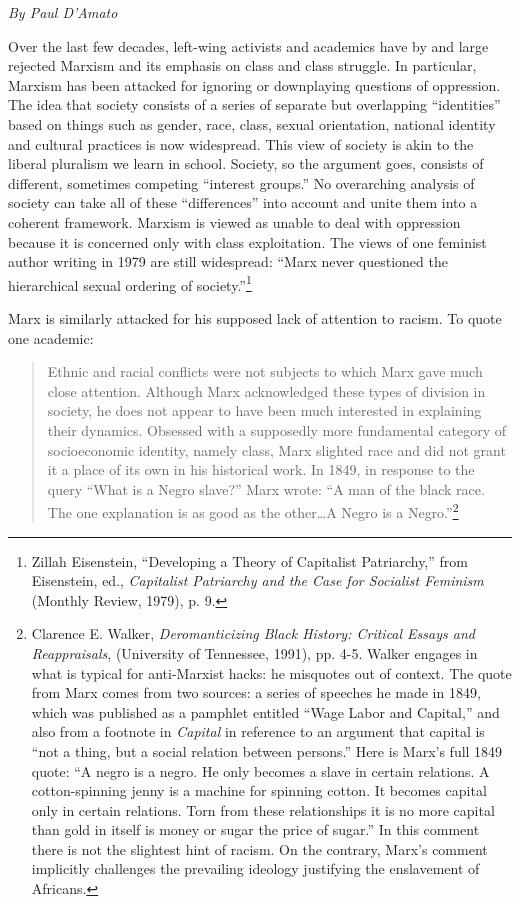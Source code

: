 \emph{By Paul D'Amato}

Over the last few decades, left-wing activists and academics have by and large rejected Marxism and its emphasis on class and class struggle. In particular, Marxism has been attacked for ignoring or downplaying questions of oppression. The idea that society consists of a series of separate but overlapping ``identities'' based on things such as gender, race, class, sexual orientation, national identity and cultural practices is now widespread. This view of society is akin to the liberal pluralism we learn in school. Society, so the argument goes, consists of different, sometimes competing ``interest groups.'' No overarching analysis of society can take all of these ``differences'' into account and unite them into a coherent framework. Marxism is viewed as unable to deal with oppression because it is concerned only with class exploitation. The views of one feminist author writing in 1979 are still widespread: ``Marx never questioned the hierarchical sexual ordering of society.''\footnote{Zillah Eisenstein, ``Developing a Theory of Capitalist Patriarchy,'' from Eisenstein, ed., \emph{Capitalist Patriarchy and the Case for Socialist Feminism} (Monthly Review, 1979), p. 9.}

Marx is similarly attacked for his supposed lack of attention to racism. To quote one academic:

\blockquote{Ethnic and racial conflicts were not subjects to which Marx gave much close attention. Although Marx acknowledged these types of division in society, he does not appear to have been much interested in explaining their dynamics. Obsessed with a supposedly more fundamental category of socioeconomic identity, namely class, Marx slighted race and did not grant it a place of its own in his historical work. In 1849, in response to the query ``What is a Negro slave?'' Marx wrote: ``A man of the black race. The one explanation is as good as the other\ldots A Negro is a Negro.''\footnote{Clarence E. Walker, \emph{Deromanticizing Black History: Critical Essays and Reappraisals}, (University of Tennessee, 1991), pp. 4-5. Walker engages in what is typical for anti-Marxist hacks: he misquotes out of context. The quote from Marx comes from two sources: a series of speeches he made in 1849, which was published as a pamphlet entitled ``Wage Labor and Capital,'' and also from a footnote in \emph{Capital} in reference to an argument that capital is ``not a thing, but a social relation between persons.'' Here is Marx's full 1849 quote: ``A negro is a negro. He only becomes a slave in certain relations. A cotton-spinning jenny is a machine for spinning cotton. It becomes capital only in certain relations. Torn from these relationships it is no more capital than gold in itself is money or sugar the price of sugar.'' In this comment there is not the slightest hint of racism. On the contrary, Marx's comment implicitly challenges the prevailing ideology justifying the enslavement of Africans.}}

